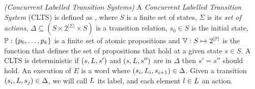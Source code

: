 \begin{definition}
	 \emph{(Concurrent Labelled Transition Systems)} 
	A \emph{Concurrent Labelled Transition System} (CLTS) is defined as 
	\cltsDef, 
	where $S$ is a finite set of states, $\Sigma$ is its {\em set of actions}, $\Delta \subseteq (S \times 2^{|\Sigma|} \times S)$ is a transition relation, $s_0 \in S$ is the initial state,
	 $\mathbb{P} : \{p_0,\ldots,p_k\}$ is a finite set of atomic 
	 propositions and $\mathbb{V} : S \mapsto  2^{|\mathbb{P}|}$ is the function that defines the set of propositions that hold at a given state $s \in S$.  
	A CLTS is deterministic if $(s,L,s')$ and $(s,L,s'')$ are in $\Delta$ then $s'=s''$ should hold.
	An execution of $E$ is a word \executionDef where $(s_i, L_i, s_{i+1}) \in \Delta$. 
	Given a transition $(s_i, L, s_j) \in \Delta$, we will call $L$ its label, and each element $l \in L$ an action.
\end{definition}